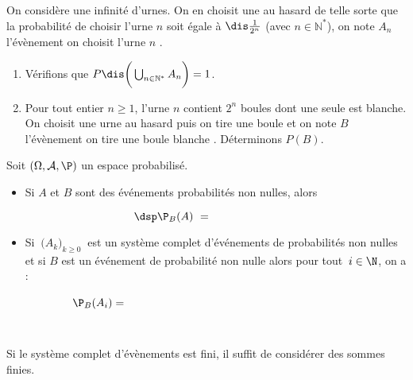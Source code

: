 \documentclass[a4paper,10pt]{report}
\begin{document}
\begin{preuve}

\vspace{6cm}
\end{preuve}

\begin{ex} On considère une infinité d'urnes. On en choisit une au hasard de telle sorte que la probabilité de choisir l'urne $n$ soit égale à $\dis \frac{1}{2^n}$ (avec $n \in \mathbb{N}^*$), on note $A_n$ l'évènement \og on choisit l'urne $n$ \fg .
\begin{enumerate}
\item Vérifions que $P \dis \bigg{(} \bigcup_{n \in \mathbb{N}^*} A_n \bigg{)} = 1$.

\vspace{5cm}
\item Pour tout entier $n \geq 1$, l'urne $n$ contient $2^n$ boules dont une seule est blanche. On choisit une urne au hasard puis on tire une boule et on note $B$ l'évènement \og on tire une boule blanche \fg . Déterminons $P(B)$. 

\vspace{6cm}
\end{enumerate}
\end{ex}

\begin{prop}
Soit $(\Omega, \mathcal{A}, \P)$ un espace probabilisé.
\begin{itemize}
\item Si $A$ et $B$ sont des événements probabilités non nulles, alors

\[ \dsp \P_B(A)\ = \qquad \qquad \qquad \qquad \]

\item Si $\ \big(A_k\big)_{k \geq 0}\ $ est un système complet d'événements de probabilités non nulles et si $B$ est un événement de probabilité non nulle alors pour tout $\,i\in\N$, on a :
$$\P_B(A_i) = \phantom{\frac{\ \P(A_i)\times  \P_{A_i}(B)\ }{ \P(B)} 
= \frac{\P(A_i)\times  \P_{A_i}(B)}{\ \sum\limits_{k=0}^{\pinf} \P(A_k)\times  \P_{A_k}(B)\ }}$$
\end{itemize}
\end{prop}

\begin{rem} Si le système complet d'évènements est fini, il suffit de considérer des sommes finies.
\end{rem}
\end{document}
